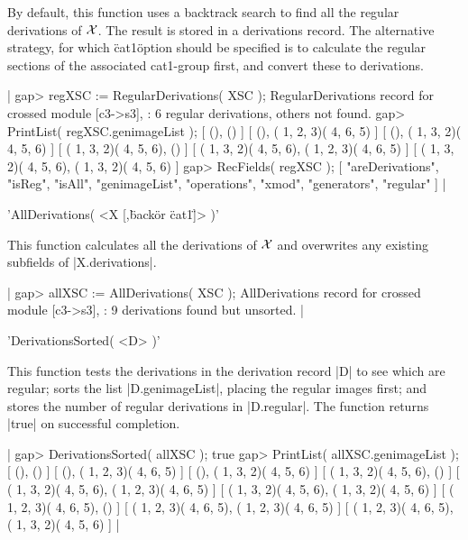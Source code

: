 {By default, this function uses a backtrack search to find all the regular
derivations of ${\cal X}$.  The result is stored in a derivations record.
The alternative strategy, for which \"cat1\" option should be specified
is to calculate the regular sections of the associated cat1-group first, 
and convert these to derivations. 

|    gap> regXSC := RegularDerivations( XSC );
    RegularDerivations record for crossed module [c3->s3],
    : 6 regular derivations, others not found.
    gap> PrintList( regXSC.genimageList );
    [ (), () ]
    [ (), ( 1, 2, 3)( 4, 6, 5) ]
    [ (), ( 1, 3, 2)( 4, 5, 6) ]
    [ ( 1, 3, 2)( 4, 5, 6), () ]
    [ ( 1, 3, 2)( 4, 5, 6), ( 1, 2, 3)( 4, 6, 5) ]
    [ ( 1, 3, 2)( 4, 5, 6), ( 1, 3, 2)( 4, 5, 6) ]
    gap> RecFields( regXSC );
    [ "areDerivations", "isReg", "isAll", "genimageList", "operations",
      "xmod", "generators", "regular" ]  |

%

'AllDerivations( <X [,\"back\" {\rm or} \"cat1\"]> )'

This function calculates all the derivations of ${\cal X}$ and overwrites
any existing subfields of |X.derivations|.

|    gap> allXSC := AllDerivations( XSC );
    AllDerivations record for crossed module [c3->s3],
    : 9 derivations found but unsorted.  |

%

'DerivationsSorted( <D> )'

This function tests the derivations in the derivation record |D|
to see which are regular; sorts the list |D.genimageList|, placing the
regular images first; and stores the number of regular derivations in
|D.regular|.  The function returns |true| on successful completion.

|    gap> DerivationsSorted( allXSC );
    true
    gap> PrintList( allXSC.genimageList );
    [ (), () ]
    [ (), ( 1, 2, 3)( 4, 6, 5) ]
    [ (), ( 1, 3, 2)( 4, 5, 6) ]
    [ ( 1, 3, 2)( 4, 5, 6), () ]
    [ ( 1, 3, 2)( 4, 5, 6), ( 1, 2, 3)( 4, 6, 5) ]
    [ ( 1, 3, 2)( 4, 5, 6), ( 1, 3, 2)( 4, 5, 6) ]
    [ ( 1, 2, 3)( 4, 6, 5), () ]
    [ ( 1, 2, 3)( 4, 6, 5), ( 1, 2, 3)( 4, 6, 5) ]
    [ ( 1, 2, 3)( 4, 6, 5), ( 1, 3, 2)( 4, 5, 6) ]  |

%

}
